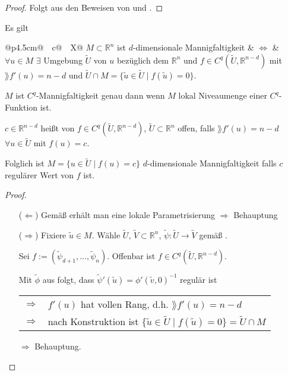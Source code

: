 \begin{proof}
	Folgt aus den Beweisen von  und .
\end{proof}

\begin{proposition}
	Es gilt
	
	\begin{tabularx}{\linewidth}{@{}p{4.5cm}@{\ \ }c@{\ \ }X@{}}
		$M\subset\mathbb{R}^{n}$ ist $d$-dimensionale Mannigfaltigkeit & $\Leftrightarrow$ & $\forall u\in M$ $\exists$ Umgebung $\tilde{U}$ von $u$ bezüglich dem $\mathbb{R}^n$ und $f\in C^q( \tilde{U}, \mathbb{R}^{n-d})$ mit $\rang f'(u) = n-d$ und $\tilde{U}\cap M = \{ \tilde{u}\in \tilde{U} \mid f(\tilde{u}) = 0 \}$.
	\end{tabularx}

\begin{underlinedenvironment}[Somit]
	$M$ ist $C^q$-Mannigfaltigkeit genau dann wenn $M$ lokal Niveaumenge einer $C^q$-Funktion ist.
\end{underlinedenvironment}
\end{proposition}

\begin{*definition}
	$c\in \mathbb{R}^{n-d}$ heißt  von $f\in C^q(\tilde{U}, \mathbb{R}^{n-d})$, $\tilde{U}\subset \mathbb{R}^n$ offen, falls $\rang f'(u) = n - d$ $\forall u\in\tilde{U}$ mit $f(u) = c$.
	
	Folglich ist $M = \{ u\in\tilde{U} \mid f(u) = c \}$ $d$-dimensionale Mannigfaltigkeit falls $c$ regulärer Wert von $f$ ist.
\end{*definition}
\begin{proof}\hspace*{0pt}
	\vspace*{\dimexpr-\baselineskip+1mm\relax}
	\begin{itemize}
		\item[($\Leftarrow$)] Gemäß  erhält man eine lokale Parametrisierung $\Rightarrow$ Behauptung
		\item[($\Rightarrow$)] Fixiere $\tilde{u}\in M$. Wähle $\tilde{U}$, $\tilde{V}\subset \mathbb{R}^n$, $\tilde{\psi}\colon\tilde{U}\to\tilde{V}$ gemäß .
		
		Sei $f:= ( \tilde{\psi}_{d+1}, \dotsc, \tilde{\psi}_n)$. Offenbar ist $f\in C^q(\tilde{U}, \mathbb{R}^{n-d})$.
		
		Mit $\tilde{\phi}$ aus  folgt, dass $\tilde{\psi}'(\tilde{u}) = \phi'(\tilde{v}, 0)^{-1}$ regulär ist\par
		\vspace*{-\parskip}
		\begin{tabularx}{\linewidth}{r@{\ \ }X}
			$\Rightarrow$ & $f'(u)$ hat vollen Rang, d.h. $\rang f'(u) = n - d$ \\
			$\Rightarrow$ & nach Konstruktion ist $\{ \tilde{u} \in \tilde{U}\mid f(\tilde{u}) = 0 \} = \tilde{U}\cap M$
		\end{tabularx}
		$\Rightarrow$ Behauptung.
	\end{itemize}
\end{proof}

